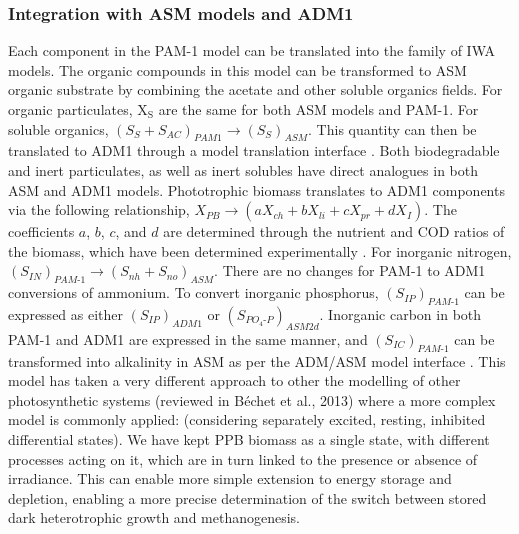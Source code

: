 \subsubsection{Integration with ASM models and ADM1}
Each component in the PAM-1 model can be translated into the family of IWA models. The organic compounds in this model can be transformed to ASM organic substrate by combining the acetate and other soluble organics fields. For organic particulates, $\mathrm{X_S}$ are the same for both ASM models and PAM-1. For soluble organics, $\left(S_S + S_{AC}\right)_{PAM1} \rightarrow \left(S_S\right)_{ASM}$. This quantity can then be translated to ADM1 through a model translation interface \cite{nopens2009}. Both biodegradable and inert particulates, as well as inert solubles have direct analogues in both ASM and ADM1 models. Phototrophic biomass translates to ADM1 components via the following relationship, $X_{PB} \rightarrow \left(aX_{ch} + bX_{li} + cX_{pr} + dX_I \right)$. The coefficients $a$, $b$, $c$, and $d$ are determined through the nutrient and COD ratios of the biomass, which have been determined experimentally \cite{nopens2009}. For inorganic nitrogen, $\left(S_{IN}\right)_{PAM\mbox{-}1} \rightarrow \left(S_{nh} + S_{no}\right)_{ASM}$. There are no changes for PAM-1 to ADM1 conversions of ammonium. To convert inorganic phosphorus, $\left(S_{IP}\right)_{PAM\mbox{-}1}$ can be expressed as either $\left(S_{IP}\right)_{ADM1}$ or $\left(S_{PO_4\mbox{-}P}\right)_{ASM2d}$. Inorganic carbon in both PAM-1 and ADM1 are expressed in the same manner, and $\left(S_{IC}\right)_{PAM\mbox{-}1}$ can be transformed into alkalinity in ASM as per the ADM/ASM model interface \cite{nopens2009}.
\skippingparagraph
This model has taken a very different approach to other the modelling of other photosynthetic systems (reviewed in Béchet et al., 2013) where a more complex model is commonly applied: (considering separately excited, resting, inhibited differential states). We have kept PPB biomass as a single state, with different processes acting on it, which are in turn linked to the presence or absence of irradiance. This can enable more simple extension to energy storage and depletion, enabling a more precise determination of the switch between stored dark heterotrophic growth and methanogenesis.


